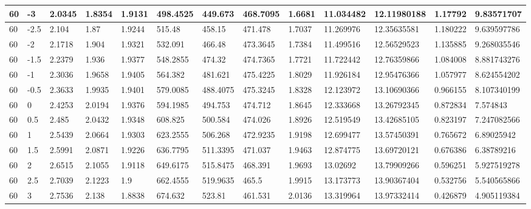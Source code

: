 \begin{longtable}{|l|l|l|l|l|l|l|l|l|l|l|l|l|}
60    & -3    & 2.0345  & 1.8354  & 1.9131  & 498.4525 & 449.673  & 468.7095 & 1.6681   & 11.034482   & 12.11980188    & 1.17792                  & 9.83571707  \\ \hline
60    & -2.5  & 2.104   & 1.87    & 1.9244  & 515.48   & 458.15   & 471.478  & 1.7037   & 11.269976   & 12.35635581    & 1.180222                 & 9.639597786 \\ \hline
60    & -2    & 2.1718  & 1.904   & 1.9321  & 532.091  & 466.48   & 473.3645 & 1.7384   & 11.499516   & 12.56529523    & 1.135885                 & 9.268035546 \\ \hline
60    & -1.5  & 2.2379  & 1.936   & 1.9377  & 548.2855 & 474.32   & 474.7365 & 1.7721   & 11.722442   & 12.76359866    & 1.084008                 & 8.881743276 \\ \hline
60    & -1    & 2.3036  & 1.9658  & 1.9405  & 564.382  & 481.621  & 475.4225 & 1.8029   & 11.926184   & 12.95476366    & 1.057977                 & 8.624554202 \\ \hline
60    & -0.5  & 2.3633  & 1.9935  & 1.9401  & 579.0085 & 488.4075 & 475.3245 & 1.8328   & 12.123972   & 13.10690366    & 0.966155                 & 8.107340199 \\ \hline
60    & 0     & 2.4253  & 2.0194  & 1.9376  & 594.1985 & 494.753  & 474.712  & 1.8645   & 12.333668   & 13.26792345    & 0.872834                 & 7.574843    \\ \hline
60    & 0.5   & 2.485   & 2.0432  & 1.9348  & 608.825  & 500.584  & 474.026  & 1.8926   & 12.519549   & 13.42685105    & 0.823197                 & 7.247082566 \\ \hline
60    & 1     & 2.5439  & 2.0664  & 1.9303  & 623.2555 & 506.268  & 472.9235 & 1.9198   & 12.699477   & 13.57450391    & 0.765672                 & 6.89025942  \\ \hline
60    & 1.5   & 2.5991  & 2.0871  & 1.9226  & 636.7795 & 511.3395 & 471.037  & 1.9463   & 12.874775   & 13.69720121    & 0.676386                 & 6.38789216  \\ \hline
60    & 2     & 2.6515  & 2.1055  & 1.9118  & 649.6175 & 515.8475 & 468.391  & 1.9693   & 13.02692    & 13.79909266    & 0.596251                 & 5.927519278 \\ \hline
60    & 2.5   & 2.7039  & 2.1223  & 1.9     & 662.4555 & 519.9635 & 465.5    & 1.9915   & 13.173773   & 13.90367404    & 0.532756                 & 5.540565866 \\ \hline
60    & 3     & 2.7536  & 2.138   & 1.8838  & 674.632  & 523.81   & 461.531  & 2.0136   & 13.319964   & 13.97332414    & 0.426879                 & 4.905119384 \\ \hline

\end{longtable}
